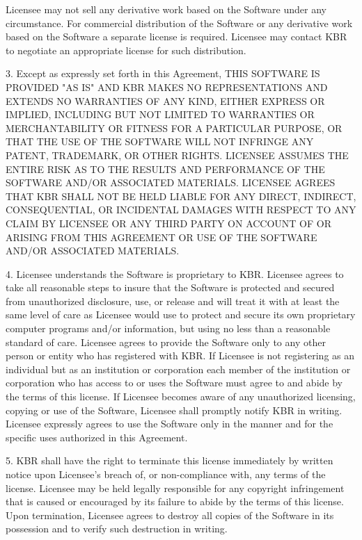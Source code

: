 Licensee may not sell any derivative work based on the Software under any circumstance. For commercial distribution of the Software or any derivative work based on the Software a separate license is required. Licensee may contact KBR to negotiate an appropriate license for such distribution.

3. Except as expressly set forth in this Agreement, THIS SOFTWARE IS PROVIDED "AS IS" AND KBR MAKES NO REPRESENTATIONS AND EXTENDS NO WARRANTIES OF ANY KIND, EITHER EXPRESS OR IMPLIED, INCLUDING BUT NOT LIMITED TO WARRANTIES OR MERCHANTABILITY OR FITNESS FOR A PARTICULAR PURPOSE, OR THAT THE USE OF THE SOFTWARE WILL NOT INFRINGE ANY PATENT, TRADEMARK, OR OTHER RIGHTS. LICENSEE ASSUMES THE ENTIRE RISK AS TO THE RESULTS AND PERFORMANCE OF THE SOFTWARE AND/OR ASSOCIATED MATERIALS. LICENSEE AGREES THAT KBR SHALL NOT BE HELD LIABLE FOR ANY DIRECT, INDIRECT, CONSEQUENTIAL, OR INCIDENTAL DAMAGES WITH RESPECT TO ANY CLAIM BY LICENSEE OR ANY THIRD PARTY ON ACCOUNT OF OR ARISING FROM THIS AGREEMENT OR USE OF THE SOFTWARE AND/OR ASSOCIATED MATERIALS.

4. Licensee understands the Software is proprietary to KBR. Licensee agrees to take all reasonable steps to insure that the Software is protected and secured from unauthorized disclosure, use, or release and will treat it with at least the same level of care as Licensee would use to protect and secure its own proprietary computer programs and/or information, but using no less than a reasonable standard of care.  Licensee agrees to provide the Software only to any other person or entity who has registered with KBR. If Licensee is not registering as an individual but as an institution or corporation each member of the institution or corporation who has access to or uses the Software must agree to and abide by the terms of this license. If Licensee becomes aware of any unauthorized licensing, copying or use of the Software, Licensee shall promptly notify KBR in writing. Licensee expressly agrees to use the Software only in the manner and for the specific uses authorized in this Agreement.

5. KBR shall have the right to terminate this license immediately by written notice upon Licensee's breach of, or non-compliance with, any terms of the license. Licensee may be held legally responsible for any copyright infringement that is caused or encouraged by its failure to abide by the terms of this license. Upon termination, Licensee agrees to destroy all copies of the Software in its possession and to verify such destruction in writing.

